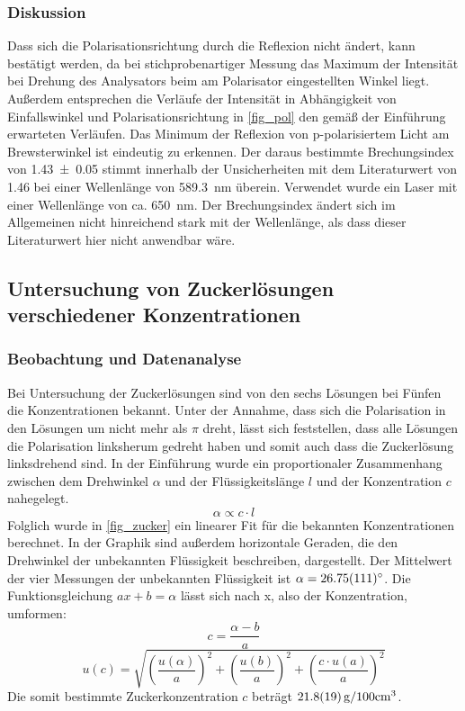 \documentclass[
	a4paper,
	12pt,
	pagesize,
	ngerman
]{scrartcl}
\begin{document}
	\subsubsection{Diskussion}
	Dass sich die Polarisationsrichtung durch die Reflexion nicht ändert, kann bestätigt werden, da bei stichprobenartiger Messung das Maximum der Intensität bei Drehung des Analysators beim am Polarisator eingestellten Winkel liegt.
	Außerdem entsprechen die Verläufe der Intensität in Abhängigkeit von Einfallswinkel und Polarisationsrichtung in \cref{fig_pol} den gemäß der Einführung erwarteten Verläufen.
	Das Minimum der Reflexion von p-polarisiertem Licht am Brewsterwinkel ist eindeutig zu erkennen.
	Der daraus bestimmte Brechungsindex von \SI{1,43 \pm 0,05}{} stimmt innerhalb der Unsicherheiten mit dem Literaturwert von \SI{1,46}{} bei einer Wellenlänge von \SI{589,3}{nm} überein. \cite{quarz_brech}
	Verwendet wurde ein Laser mit einer Wellenlänge von ca. \SI{650}{\nano \meter}.
	Der Brechungsindex ändert sich im Allgemeinen nicht hinreichend stark mit der Wellenlänge, als dass dieser Literaturwert hier nicht anwendbar wäre.

	\subsection{Untersuchung von Zuckerlösungen verschiedener Konzentrationen}
	\subsubsection{Beobachtung und Datenanalyse}
	Bei Untersuchung der Zuckerlösungen sind von den sechs Lösungen bei Fünfen die Konzentrationen bekannt.
	Unter der Annahme, dass sich die Polarisation in den Lösungen um nicht mehr als $\pi$ dreht, lässt sich feststellen, dass alle Lösungen die Polarisation linksherum gedreht haben und somit auch dass die Zuckerlösung linksdrehend sind.
	In der Einführung wurde ein proportionaler Zusammenhang zwischen dem Drehwinkel $\alpha$ und der Flüssigkeitslänge $l$ und der Konzentration $c$ nahegelegt.
	\begin{equation}
		\alpha \propto c \cdot l
	\end{equation}
	Folglich wurde in \cref{fig_zucker} ein linearer Fit für die bekannten Konzentrationen berechnet.
	In der Graphik sind außerdem horizontale Geraden, die den Drehwinkel der unbekannten Flüssigkeit beschreiben, dargestellt.
	Der Mittelwert der vier Messungen der unbekannten Flüssigkeit ist $\alpha=\SI{26,75+-1,11}{\degree}$.
	Die Funktionsgleichung $ax+b=\alpha$ lässt sich nach x, also der Konzentration, umformen:
	\begin{equation}
		c = \frac{\alpha-b}{a}
	\end{equation}
	\begin{equation}
		u(c) = \sqrt{ \left(\frac{u(\alpha)}{a}\right)^2 + \left(\frac{u(b)}{a}\right)^2 + \left(\frac{c \cdot u(a)}{a}\right)^2}
	\end{equation}
	Die somit bestimmte Zuckerkonzentration $c$ beträgt $\SI{21,8+-1,9}{g/100 cm^3}$.
\end{document}
